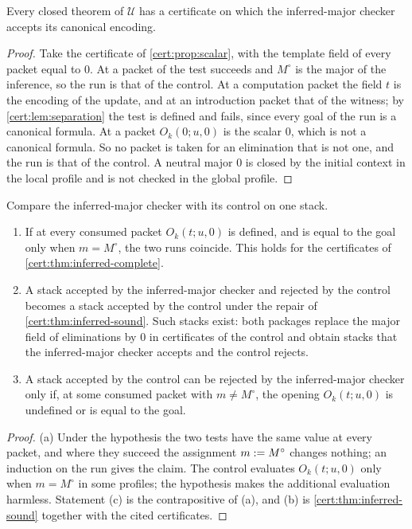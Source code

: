 \begin{theorem}\label{cert:thm:inferred-complete}
Every closed theorem of $\mathcal U$ has a certificate on which the
inferred-major checker accepts its canonical encoding.
\end{theorem}
\begin{proof}
Take the certificate of \cref{cert:prop:scalar}, with the template field of
every  packet equal to $0$. At a packet of  the test
succeeds and $M^{\circ}$ is the major of the inference, so the run is that of
the control. At a computation packet the field $t$ is the encoding of the
update, and at an introduction packet that of the witness; by
\cref{cert:lem:separation} the test is defined and fails, since every goal of
the run is a canonical formula. At a  packet $O_k(0;u,0)$ is the
scalar $0$, which is not a canonical formula. So no packet is taken for an
elimination that is not one, and the run is that of the control. A neutral
major $0$ is closed by the initial context in the local profile and is not
checked in the global profile.
\end{proof}

\begin{proposition}\label{cert:prop:inferred-change}
Compare the inferred-major checker with its control on one stack.
\begin{enumerate}[label=(\alph*)]
\item If at every consumed packet $O_k(t;u,0)$ is defined, and is equal to the
goal only when $m=M^{\circ}$, the two runs coincide. This holds for the
certificates of \cref{cert:thm:inferred-complete}.
\item A stack accepted by the inferred-major checker and rejected by the
control becomes a stack accepted by the control under the repair of
\cref{cert:thm:inferred-sound}. Such stacks exist: both packages replace the
major field of eliminations by $0$ in certificates of the control and obtain
stacks that the inferred-major checker accepts and the control rejects.
\item A stack accepted by the control can be rejected by the inferred-major
checker only if, at some consumed packet with $m\neq M^{\circ}$, the opening
$O_k(t;u,0)$ is undefined or is equal to the goal.
\end{enumerate}
\end{proposition}
\begin{proof}
(a) Under the hypothesis the two tests have the same value at every packet,
and where they succeed the assignment $m\mathrel{:=} M^{\circ}$ changes nothing; an
induction on the run gives the claim. The control evaluates $O_k(t;u,0)$ only
when $m=M^{\circ}$ in some profiles; the hypothesis makes the additional
evaluation harmless. Statement (c) is the contrapositive of (a), and (b) is
\cref{cert:thm:inferred-sound} together with the cited certificates.
\end{proof}

